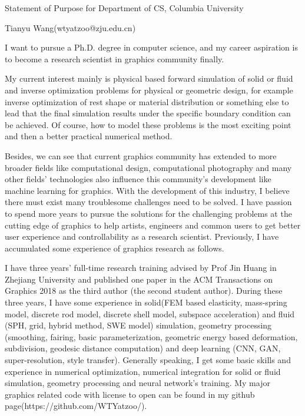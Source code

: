 \documentclass[a4paper,12pt]{article}
\begin{document}
\centerline{\large{Statement of Purpose for Department of CS, Columbia University}}
\vspace{2ex}
\centerline{\large{Tianyu Wang(wtyatzoo@zju.edu.cn)}}
\vspace{2ex}

I want to pursue a Ph.D. degree in computer science, and my career aspiration is to become a research scientist in graphics community finally.\vspace{1.2ex}

My current interest mainly is physical based forward simulation of solid or fluid and inverse optimization problems for physical or geometric design, for example inverse optimization of rest shape or material distribution or something else to lead that the final simulation results under the specific boundary condition can be achieved. Of course, how to model these problems is the most exciting point and then a better practical numerical method.\vspace{1.2ex}

Besides, we can see that current graphics community has extended to more broader fields like computational design, computational photography and many other fields' technologies also influence this community's development like machine learning for graphics. With the development of this industry, I believe there must exist many troublesome challenges need to be solved. I have passion to spend more years to pursue the solutions for the challenging problems at the cutting edge of graphics to help artists, engineers and common users to get better user experience and controllability as a research scientist. Previously, I have accumulated some experience of graphics research as follows. \vspace{1.2ex}  

I have three years' full-time research training advised by Prof Jin Huang in Zhejiang University and published one paper in the ACM Transactions on Graphics 2018 as the third author (the second student author). During these three years, I have some experience in solid(FEM based elasticity, mass-spring model, discrete rod model, discrete shell model, subspace acceleration) and fluid (SPH, grid, hybrid method, SWE model) simulation, geometry processing (smoothing, fairing, basic parameterization, geometric energy based deformation, subdivision, geodesic distance computation) and deep learning (CNN, GAN, super-resolution, style transfer). Generally speaking, I get some basic skills and experience in numerical optimization, numerical integration for solid or fluid simulation, geometry processing and neural network's training. My major graphics related code with license to open can be found in my github page(https://github.com/WTYatzoo/). \vspace{1.2ex} 
\end{document}
